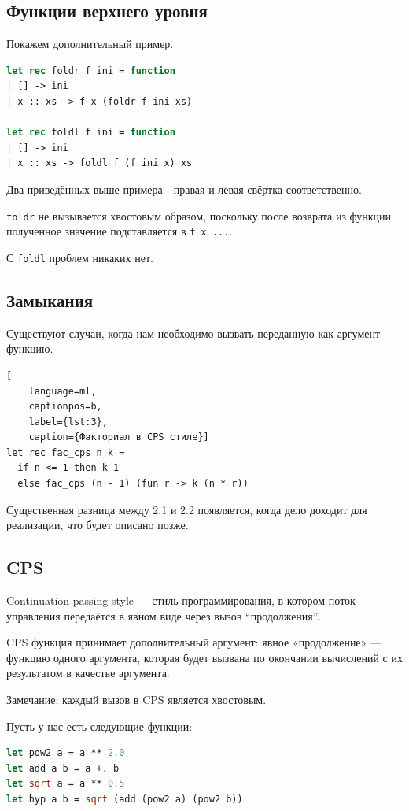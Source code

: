 \subsection{Функции верхнего уровня}

Покажем дополнительный пример.

\begin{lstlisting}[language=ml]
let rec foldr f ini = function
| [] -> ini
| x :: xs -> f x (foldr f ini xs)

let rec foldl f ini = function
| [] -> ini
| x :: xs -> foldl f (f ini x) xs
\end{lstlisting}

Два приведённых выше примера - правая и левая свёртка соответственно.

\texttt{foldr} не вызывается хвостовым образом, поскольку после возврата из функции полученное значение подставляется в \lstinline|f x ...|.

С \texttt{foldl} проблем никаких нет.
\subsection{Замыкания}

Существуют случаи, когда нам необходимо вызвать переданную как аргумент функцию.
\begin{lstlisting}[
	language=ml,
	captionpos=b,
	label={lst:3},
	caption={Факториал в CPS стиле}]
let rec fac_cps n k = 
  if n <= 1 then k 1
  else fac_cps (n - 1) (fun r -> k (n * r))
\end{lstlisting}

Существенная разница между 2.1 и 2.2 появляется, когда дело доходит для реализации, что будет описано позже.

\subsection{CPS}
Continuation-passing style — стиль программирования, в котором поток управления передаётся в явном виде через вызов “продолжения”.

CPS функция принимает дополнительный аргумент: явное «продолжение» — функцию одного аргумента, которая будет вызвана по окончании вычислений с их результатом в качестве аргумента.

Замечание: каждый вызов в CPS является хвостовым.

Пусть у нас есть следующие функции:
\begin{lstlisting}[language=ml]
let pow2 a = a ** 2.0
let add a b = a +. b
let sqrt a = a ** 0.5
let hyp a b = sqrt (add (pow2 a) (pow2 b))
\end{lstlisting}

